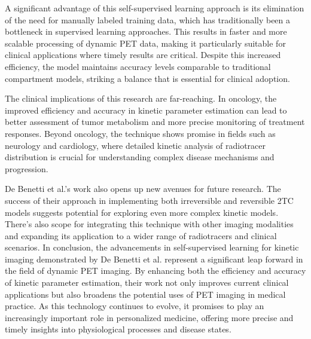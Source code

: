A significant advantage of this self-supervised learning approach is its elimination of the need for manually labeled training data, which has traditionally been a bottleneck in supervised learning approaches. This results in faster and more scalable processing of dynamic PET data, making it particularly suitable for clinical applications where timely results are critical. Despite this increased efficiency, the model maintains accuracy levels comparable to traditional compartment models, striking a balance that is essential for clinical adoption.

The clinical implications of this research are far-reaching. In oncology, the improved efficiency and accuracy in kinetic parameter estimation can lead to better assessment of tumor metabolism and more precise monitoring of treatment responses. Beyond oncology, the technique shows promise in fields such as neurology and cardiology, where detailed kinetic analysis of radiotracer distribution is crucial for understanding complex disease mechanisms and progression.

De Benetti et al.'s work also opens up new avenues for future research. The success of their approach in implementing both irreversible and reversible 2TC models suggests potential for exploring even more complex kinetic models. There's also scope for integrating this technique with other imaging modalities and expanding its application to a wider range of radiotracers and clinical scenarios.
In conclusion, the advancements in self-supervised learning for kinetic imaging demonstrated by De Benetti et al. represent a significant leap forward in the field of dynamic PET imaging. By enhancing both the efficiency and accuracy of kinetic parameter estimation, their work not only improves current clinical applications but also broadens the potential uses of PET imaging in medical practice. As this technology continues to evolve, it promises to play an increasingly important role in personalized medicine, offering more precise and timely insights into physiological processes and disease states.